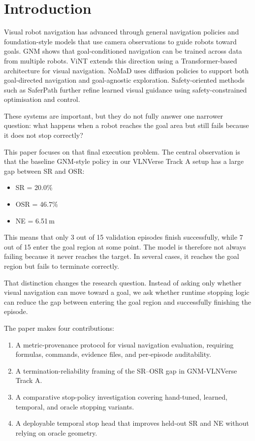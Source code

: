 \documentclass[conference]{IEEEtran}
\begin{document}
\section{Introduction}
Visual robot navigation has advanced through general navigation policies and foundation-style models that use camera observations to guide robots toward goals. GNM shows that goal-conditioned navigation can be trained across data from multiple robots. ViNT extends this direction using a Transformer-based architecture for visual navigation. NoMaD uses diffusion policies to support both goal-directed navigation and goal-agnostic exploration. Safety-oriented methods such as SaferPath further refine learned visual guidance using safety-constrained optimisation and control.

These systems are important, but they do not fully answer one narrower question: what happens when a robot reaches the goal area but still fails because it does not stop correctly?

This paper focuses on that final execution problem. The central observation is that the baseline GNM-style policy in our VLNVerse Track A setup has a large gap between SR and OSR:
\begin{itemize}
    \item SR = 20.0\%
    \item OSR = 46.7\%
    \item NE = 6.51\,m
\end{itemize}
This means that only 3 out of 15 validation episodes finish successfully, while 7 out of 15 enter the goal region at some point. The model is therefore not always failing because it never reaches the target. In several cases, it reaches the goal region but fails to terminate correctly.

That distinction changes the research question. Instead of asking only whether visual navigation can move toward a goal, we ask whether runtime stopping logic can reduce the gap between entering the goal region and successfully finishing the episode.

The paper makes four contributions:
\begin{enumerate}
    \item A metric-provenance protocol for visual navigation evaluation, requiring formulas, commands, evidence files, and per-episode auditability.
    \item A termination-reliability framing of the SR--OSR gap in GNM-VLNVerse Track A.
    \item A comparative stop-policy investigation covering hand-tuned, learned, temporal, and oracle stopping variants.
    \item A deployable temporal stop head that improves held-out SR and NE without relying on oracle geometry.
\end{enumerate}
\end{document}
